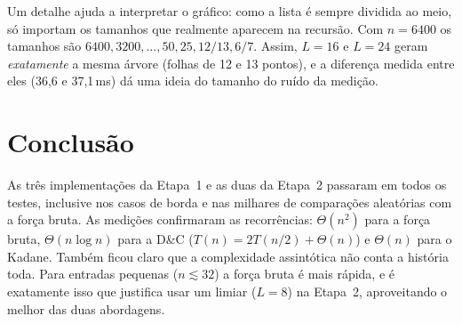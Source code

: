 \documentclass[11pt,a4paper]{article}
\begin{document}
Um detalhe ajuda a interpretar o gráfico: como a lista é sempre dividida ao meio, só importam os tamanhos que realmente aparecem na recursão. Com $n=6400$ os tamanhos são $6400, 3200, \dots, 50, 25, 12/13, 6/7$. Assim, $L=16$ e $L=24$ geram \emph{exatamente} a mesma árvore (folhas de 12 e 13 pontos), e a diferença medida entre eles (36,6 e 37,1\,ms) dá uma ideia do tamanho do ruído da medição.

\section{Conclusão}

As três implementações da Etapa~1 e as duas da Etapa~2 passaram em todos os testes, inclusive nos casos de borda e nas milhares de comparações aleatórias com a força bruta. As medições confirmaram as recorrências: $\Theta(n^2)$ para a força bruta, $\Theta(n\log n)$ para a D\&C ($T(n)=2T(n/2)+\Theta(n)$) e $\Theta(n)$ para o Kadane. Também ficou claro que a complexidade assintótica não conta a história toda. Para entradas pequenas ($n\lesssim32$) a força bruta é mais rápida, e é exatamente isso que justifica usar um limiar ($L=8$) na Etapa~2, aproveitando o melhor das duas abordagens.
\end{document}
